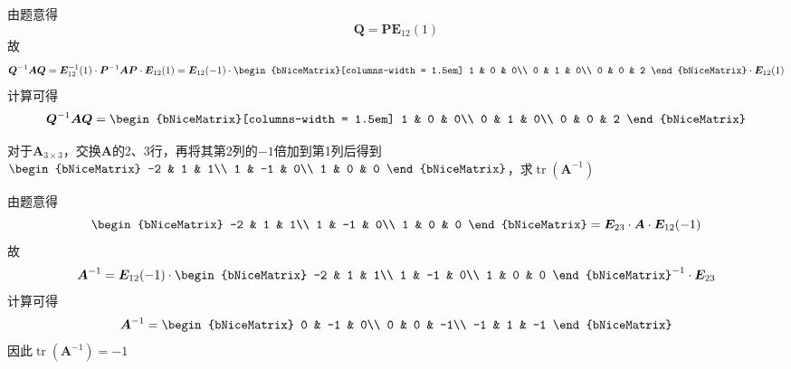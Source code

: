 \documentclass[12pt, a4paper, oneside, UTF8]{ctexbook}
\begin{document}
\begin{solution}
    由题意得
    \[
        \bm{Q} = \bm{P}\bm{E}_{12}(1)
    \]
    故
    \[
        \bm{Q}^{-1}\bm{A}\bm{Q} = \bm{E}_{12}^{-1}(1)\cdot\bm{P}^{-1}\bm{A}\bm{P}\cdot\bm{E}_{12}(1) = \bm{E}_{12}(-1)\cdot
        \begin{bNiceMatrix}[columns-width = 1.5em]
            1 & 0 & 0\\
            0 & 1 & 0\\
            0 & 0 & 2
        \end{bNiceMatrix}
        \cdot\bm{E}_{12}(1)
    \]
    计算可得
    \[
        \bm{Q}^{-1}\bm{A}\bm{Q} =
        \begin{bNiceMatrix}[columns-width = 1.5em]
            1 & 0 & 0\\
            0 & 1 & 0\\
            0 & 0 & 2
        \end{bNiceMatrix}
    \]
\end{solution}
\begin{example}
    对于$\bm{A}_{3 \times 3}$，交换$\bm{A}$的2、3行，再将其第2列的$-1$倍加到第1列后得到$\begin{bNiceMatrix}
        -2 & 1 & 1\\
        1 & -1 & 0\\
        1 & 0 & 0
    \end{bNiceMatrix}$，求$\operatorname{tr}(\bm{A}^{-1})$
\end{example}
\begin{solution}
    由题意得
    \[
        \begin{bNiceMatrix}
            -2 & 1 & 1\\
            1 & -1 & 0\\
            1 & 0 & 0
        \end{bNiceMatrix} = \bm{E}_{23} \cdot \bm{A} \cdot \bm{E}_{12}(-1)
    \]
    故
    \[
        \bm{A}^{-1} = \bm{E}_{12}(-1) \cdot 
        \begin{bNiceMatrix}
            -2 & 1 & 1\\
            1 & -1 & 0\\
            1 & 0 & 0
        \end{bNiceMatrix}^{-1} \cdot \bm{E}_{23}
    \]
    计算可得
    \[
        \bm{A}^{-1} =
        \begin{bNiceMatrix}
            0 & -1 & 0\\
            0 & 0 & -1\\
            -1 & 1 & -1
        \end{bNiceMatrix}
    \]
    因此$\operatorname{tr}(\bm{A}^{-1}) = -1$
\end{solution}
\end{document}
